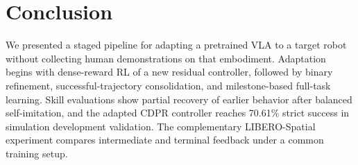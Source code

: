 \section{Conclusion}\label{sec:conclusion}
We presented a staged pipeline for adapting a pretrained VLA to a target robot without collecting human demonstrations on that embodiment. Adaptation begins with dense-reward RL of a new residual controller, followed by binary refinement, successful-trajectory consolidation, and milestone-based full-task learning. Skill evaluations show partial recovery of earlier behavior after balanced self-imitation, and the adapted CDPR controller reaches 70.61\% strict success in simulation development validation. The complementary LIBERO-Spatial experiment compares intermediate and terminal feedback under a common training setup.
